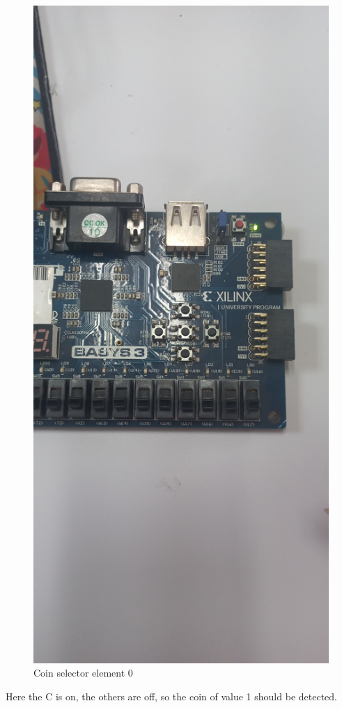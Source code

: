 \documentclass{article}
\begin{document}
\begin{multicols}{2}
	\begin{figure}[H]
		\centering
		\includegraphics[width=0.8\linewidth]{images/diagrams/coin-selector/coin-selector0.jpg}
		\caption{Coin selector element 0}
		\label{Coin selector element 0}
	\end{figure}

	Here the C is on, the others are off, so the coin of value 1 should be detected.


\end{multicols}
\end{document}
